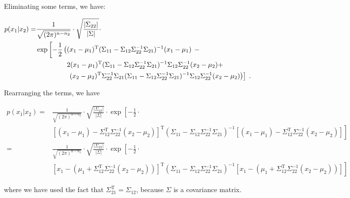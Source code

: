 \documentclass[a4paper,12pt,twoside]{book}
\begin{document}
Eliminating some terms, we have:

\begin{equation} \label{eq:mvn-cond-mvn-cond-s7}
\begin{split}
p(x_1|x_2) = &\frac{1}{\sqrt{(2 \pi)^{n-n_2}}} \cdot \sqrt{\frac{|\Sigma_{22}|}{|\Sigma|}} \cdot \\
&\exp \left[ -\frac{1}{2} \left( (x_1-\mu_1)^\mathrm{T} (\Sigma_{11} - \Sigma_{12} \Sigma_{22}^{-1} \Sigma_{21})^{-1} (x_1-\mu_1) \right. \right. - \\
&\hphantom{\exp \left[ -\frac{1}{2} \left( \right. \right.} 2 (x_1-\mu_1)^\mathrm{T} (\Sigma_{11} - \Sigma_{12} \Sigma_{22}^{-1} \Sigma_{21})^{-1} \Sigma_{12} \Sigma_{22}^{-1} (x_2-\mu_2) + \\
&\hphantom{\exp \left[ -\frac{1}{2} \left( \right. \right.} \left. \left. (x_2-\mu_2)^\mathrm{T} \Sigma_{22}^{-1} \Sigma_{21} (\Sigma_{11} - \Sigma_{12} \Sigma_{22}^{-1} \Sigma_{21})^{-1} \Sigma_{12} \Sigma_{22}^{-1} (x_2-\mu_2) \right) \right] \; .
\end{split}
\end{equation}

Rearranging the terms, we have

\begin{equation} \label{eq:mvn-cond-mvn-cond-s8}
\begin{split}
p(x_1|x_2) = &\frac{1}{\sqrt{(2 \pi)^{n-n_2}}} \cdot \sqrt{\frac{|\Sigma_{22}|}{|\Sigma|}} \cdot \exp \left[ -\frac{1}{2} \cdot \right. \\
&\! \left. \left[ (x_1-\mu_1) - \Sigma_{12}^\mathrm{T} \Sigma_{22}^{-1} (x_2-\mu_2) \right]^\mathrm{T} (\Sigma_{11} - \Sigma_{12} \Sigma_{22}^{-1} \Sigma_{21})^{-1} \left[ (x_1-\mu_1) - \Sigma_{12}^\mathrm{T} \Sigma_{22}^{-1} (x_2-\mu_2) \right] \right] \\
= &\frac{1}{\sqrt{(2 \pi)^{n-n_2}}} \cdot \sqrt{\frac{|\Sigma_{22}|}{|\Sigma|}} \cdot \exp \left[ -\frac{1}{2} \cdot \right. \\
&\! \left. \left[ x_1 - \left( \mu_1 + \Sigma_{12}^\mathrm{T} \Sigma_{22}^{-1} (x_2-\mu_2) \right) \right]^\mathrm{T} (\Sigma_{11} - \Sigma_{12} \Sigma_{22}^{-1} \Sigma_{21})^{-1} \left[ x_1 - \left( \mu_1 + \Sigma_{12}^\mathrm{T} \Sigma_{22}^{-1} (x_2-\mu_2) \right) \right] \right]
\end{split}
\end{equation}

where we have used the fact that $\Sigma_{21}^\mathrm{T} = \Sigma_{12}$, because $\Sigma$ is a covariance matrix.
\end{document}
